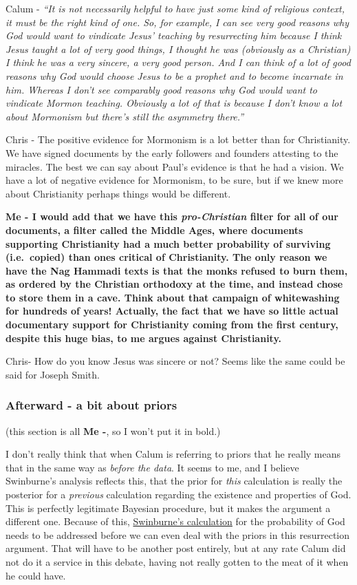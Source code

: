 Calum - \emph{``It is not necessarily helpful to have just some kind of
religious context, it must be the right kind of one. So, for example, I
can see very good reasons why God would want to vindicate Jesus'
teaching by resurrecting him because I think Jesus taught a lot of very
good things, I thought he was (obviously as a Christian) I think he was
a very sincere, a very good person. And I can think of a lot of good
reasons why God would choose Jesus to be a prophet and to become
incarnate in him. Whereas I don't see comparably good reasons why God
would want to vindicate Mormon teaching. Obviously a lot of that is
because I don't know a lot about Mormonism but there's still the
asymmetry there.''}

Chris - The positive evidence for Mormonism is a lot better than for
Christianity. We have signed documents by the early followers and
founders attesting to the miracles. The best we can say about Paul's
evidence is that he had a vision. We have a lot of negative evidence for
Mormonism, to be sure, but if we knew more about Christianity perhaps
things would be different.

\textbf{Me - I would add that we have this \emph{pro-Christian} filter
for all of our documents, a filter called the Middle Ages, where
documents supporting Christianity had a much better probability of
surviving (i.e.~copied) than ones critical of Christianity. The only
reason we have the Nag Hammadi texts is that the monks refused to burn
them, as ordered by the Christian orthodoxy at the time, and instead
chose to store them in a cave. Think about that campaign of whitewashing
for hundreds of years! Actually, the fact that we have so little actual
documentary support for Christianity coming from the first century,
despite this huge bias, to me argues against Christianity.}

Chris- How do you know Jesus was sincere or not? Seems like the same
could be said for Joseph Smith.

\subsubsection{Afterward - a bit about
priors}\label{afterward-abitaboutpriors}

(this section is all \textbf{Me -}, so I won't put it in bold.)

I don't really think that when Calum is referring to priors that he
really means that in the same way as \emph{before the data}. It seems to
me, and I believe Swinburne's analysis reflects this, that the prior for
\emph{this} calculation is really the posterior for a \emph{previous}
calculation regarding the existence and properties of God. This is
perfectly legitimate Bayesian procedure, but it makes the argument a
different one. Because of this,
\href{http://ndpr.nd.edu/news/23553-the-resurrection-of-god-incarnate/}{Swinburne's
calculation} for the probability of God needs to be addressed before we
can even deal with the priors in this resurrection argument. That will
have to be another post entirely, but at any rate Calum did not do it a
service in this debate, having not really gotten to the meat of it when
he could have.



